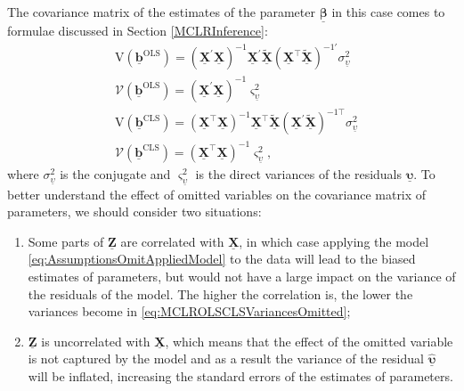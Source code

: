 \documentclass[
]{book}
\providecommand{\tightlist}{%
  \setlength{\itemsep}{0pt}\setlength{\parskip}{0pt}}
\begin{document}
The covariance matrix of the estimates of the parameter \(\underline{\boldsymbol{\beta}}\) in this case comes to formulae discussed in Section \ref{MCLRInference}:
\begin{equation}
    \begin{aligned}
        & \mathrm{V}\left( \underline{\boldsymbol{b}}^{\text{OLS}} \right) = \left( \underline{\mathbf{X}}^\prime \underline{\mathbf{X}} \right)^{-1} \underline{\mathbf{X}}^\prime \tilde{\underline{\mathbf{X}}} \left( {\underline{\mathbf{X}}}^\top \tilde{\underline{\mathbf{X}}} \right)^{-1 \prime}  \sigma_{\underline{\upsilon}}^2 \\
        & \mathcal{V}\left( \underline{\boldsymbol{b}}^{\text{OLS}} \right) = \left( \underline{\mathbf{X}}^\prime \underline{\mathbf{X}} \right)^{-1} \varsigma_{\underline{\upsilon}}^2 \\
        & \mathrm{V}\left( \underline{\boldsymbol{b}}^{\text{CLS}} \right) = \left( \underline{\mathbf{X}}^\top \underline{\mathbf{X}} \right)^{-1} \underline{\mathbf{X}}^\top \tilde{\underline{\mathbf{X}}} \left( {\underline{\mathbf{X}}}^\prime \tilde{\underline{\mathbf{X}}} \right)^{-1 \top}  \sigma_{\underline{\upsilon}}^2 \\
        & \mathcal{V}\left( \underline{\boldsymbol{b}}^{\text{CLS}} \right) = \left( \underline{\mathbf{X}}^\top \underline{\mathbf{X}} \right)^{-1} \varsigma_{\underline{\upsilon}}^2 ,
    \end{aligned}
    \label{eq:MCLROLSCLSVariancesOmitted}
\end{equation}
where \(\sigma_{\underline{\upsilon}}^2\) is the conjugate and \(\varsigma_{\underline{\upsilon}}^2\) is the direct variances of the residuals \(\underline{\boldsymbol{\upsilon}}\). To better understand the effect of omitted variables on the covariance matrix of parameters, we should consider two situations:

\begin{enumerate}
\def\labelenumi{\arabic{enumi}.}
\tightlist
\item
  Some parts of \(\underline{\mathbf{Z}}\) are correlated with \(\underline{\mathbf{X}}\), in which case applying the model \eqref{eq:AssumptionsOmitAppliedModel} to the data will lead to the biased estimates of parameters, but would not have a large impact on the variance of the residuals of the model. The higher the correlation is, the lower the variances become in \eqref{eq:MCLROLSCLSVariancesOmitted};
\item
  \(\underline{\mathbf{Z}}\) is uncorrelated with \(\underline{\mathbf{X}}\), which means that the effect of the omitted variable is not captured by the model and as a result the variance of the residual \(\hat{\underline{\boldsymbol{\upsilon}}}\) will be inflated, increasing the standard errors of the estimates of parameters.
\end{enumerate}
\end{document}
